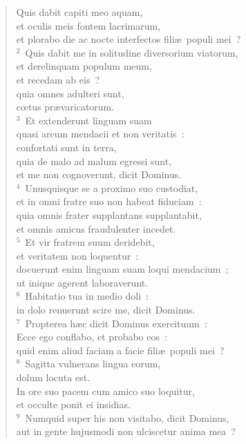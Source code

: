 \begin{flushleft}\begin{verse}\vspace{-19pt}Quis dabit capiti meo aquam,\\ et oculis meis fontem lacrimarum,\\ et plorabo die ac nocte interfectos fili\ae\ populi mei~?\\
${}^{2}$~Quis dabit me in solitudine diversorium viatorum,\\ et derelinquam populum meum,\\ et recedam ab eis~?\\ quia omnes adulteri sunt,\\ cœtus pr\ae varicatorum.\\
${}^{3}$~Et extenderunt linguam suam\\ quasi arcum mendacii et non veritatis~:\\ confortati sunt in terra,\\ quia de malo ad malum egressi sunt,\\ et me non cognoverunt, dicit Dominus.\\
${}^{4}$~Unusquisque se a proximo suo custodiat,\\ et in omni fratre suo non habeat fiduciam~:\\ quia omnis frater supplantans supplantabit,\\ et omnis amicus fraudulenter incedet.\\
${}^{5}$~Et vir fratrem suum deridebit,\\ et veritatem non loquentur~:\\ docuerunt enim linguam suam loqui mendacium~;\\ ut inique agerent laboraverunt.\\
${}^{6}$~Habitatio tua in medio doli~:\\ in dolo renuerunt scire me, dicit Dominus.\\
${}^{7}$~Propterea h\ae c dicit Dominus exercituum~:\\ Ecce ego conflabo, et probabo eos~:\\ quid enim aliud faciam a facie fili\ae\ populi mei~?\\
${}^{8}$~Sagitta vulnerans lingua eorum,\\ dolum locuta est.\\ In ore suo pacem cum amico suo loquitur,\\ et occulte ponit ei insidias.\\
${}^{9}$~Numquid super his non visitabo, dicit Dominus,\\ aut in gente hujusmodi non ulciscetur anima mea~?\\

\end{verse}
\end{flushleft}
